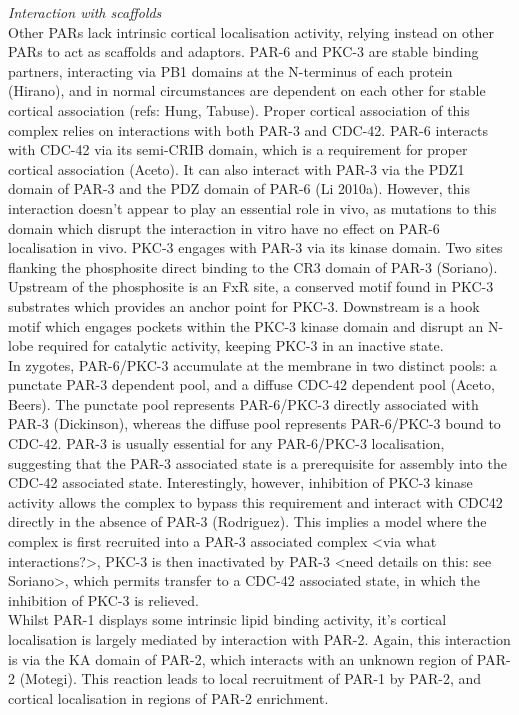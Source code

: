 \documentclass[12pt]{"article"}
\begin{document}
\textit{Interaction with scaffolds}\\

Other PARs lack intrinsic cortical localisation activity, relying instead on other PARs to act as scaffolds and adaptors. PAR-6 and PKC-3 are stable binding partners, interacting via PB1 domains at the N-terminus of each protein (Hirano), and in normal circumstances are dependent on each other for stable cortical association (refs: Hung, Tabuse). Proper cortical association of this complex relies on interactions with both PAR-3 and CDC-42. PAR-6 interacts with CDC-42 via its semi-CRIB domain, which is a requirement for proper cortical association (Aceto). It can also interact with PAR-3 via the PDZ1 domain of PAR-3 and the PDZ domain of PAR-6 (Li 2010a). However, this interaction doesn’t appear to play an essential role in vivo, as mutations to this domain which disrupt the interaction in vitro have no effect on PAR-6 localisation in vivo. PKC-3 engages with PAR-3 via its kinase domain. Two sites flanking the phosphosite direct binding to the CR3 domain of PAR-3 (Soriano). Upstream of the phosphosite is an FxR site, a conserved motif found in PKC-3 substrates which provides an anchor point for PKC-3. Downstream is a hook motif which engages pockets within the PKC-3 kinase domain and disrupt an N-lobe required for catalytic activity, keeping PKC-3 in an inactive state.\\

In zygotes, PAR-6/PKC-3 accumulate at the membrane in two distinct pools: a punctate PAR-3 dependent pool, and a diffuse CDC-42 dependent pool (Aceto, Beers). The punctate pool represents PAR-6/PKC-3 directly associated with PAR-3 (Dickinson), whereas the diffuse pool represents PAR-6/PKC-3 bound to CDC-42. PAR-3 is usually essential for any PAR-6/PKC-3 localisation, suggesting that the PAR-3 associated state is a prerequisite for assembly into the CDC-42 associated state. Interestingly, however, inhibition of PKC-3 kinase activity allows the complex to bypass this requirement and interact with CDC42 directly in the absence of PAR-3 (Rodriguez). This implies a model where the complex is first recruited into a PAR-3 associated complex <via what interactions?>, PKC-3 is then inactivated by PAR-3 <need details on this: see Soriano>, which permits transfer to a CDC-42 associated state, in which the inhibition of PKC-3 is relieved.\\

Whilst PAR-1 displays some intrinsic lipid binding activity, it’s cortical localisation is largely mediated by interaction with PAR-2. Again, this interaction is via the KA domain of PAR-2, which interacts with an unknown region of PAR-2 (Motegi). This reaction leads to local recruitment of PAR-1 by PAR-2, and cortical localisation in regions of PAR-2 enrichment.\\
\end{document}
